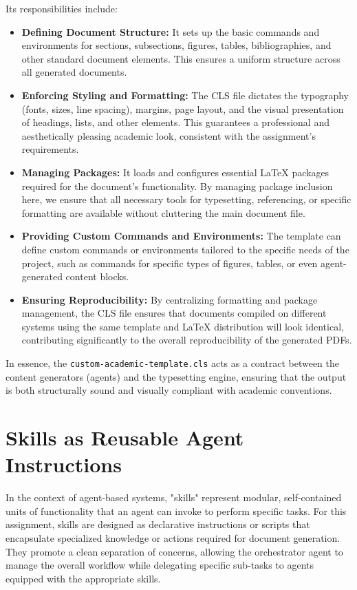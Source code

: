 \documentclass{custom-academic-template}
\begin{document}
Its responsibilities include:
\begin{itemize}
    \item 	\textbf{Defining Document Structure:} It sets up the basic commands and environments for sections, subsections, figures, tables, bibliographies, and other standard document elements. This ensures a uniform structure across all generated documents.
    \item 	\textbf{Enforcing Styling and Formatting:} The CLS file dictates the typography (fonts, sizes, line spacing), margins, page layout, and the visual presentation of headings, lists, and other elements. This guarantees a professional and aesthetically pleasing academic look, consistent with the assignment's requirements.
    \item 	\textbf{Managing Packages:} It loads and configures essential LaTeX packages required for the document's functionality. By managing package inclusion here, we ensure that all necessary tools for typesetting, referencing, or specific formatting are available without cluttering the main document file.
    \item 	\textbf{Providing Custom Commands and Environments:} The template can define custom commands or environments tailored to the specific needs of the project, such as commands for specific types of figures, tables, or even agent-generated content blocks.
    \item 	\textbf{Ensuring Reproducibility:} By centralizing formatting and package management, the CLS file ensures that documents compiled on different systems using the same template and LaTeX distribution will look identical, contributing significantly to the overall reproducibility of the generated PDFs.
\end{itemize}
In essence, the 	\texttt{custom-academic-template.cls} acts as a contract between the content generators (agents) and the typesetting engine, ensuring that the output is both structurally sound and visually compliant with academic conventions.

\section{Skills as Reusable Agent Instructions}
In the context of agent-based systems, "skills" represent modular, self-contained units of functionality that an agent can invoke to perform specific tasks. For this assignment, skills are designed as declarative instructions or scripts that encapsulate specialized knowledge or actions required for document generation. They promote a clean separation of concerns, allowing the orchestrator agent to manage the overall workflow while delegating specific sub-tasks to agents equipped with the appropriate skills.
\end{document}
